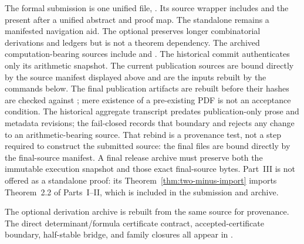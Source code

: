 \documentclass[11pt,reqno]{amsart}
\theoremstyle{plain}
\theoremstyle{definition}
\begin{document}
The formal submission is one unified file, .  Its source
wrapper  includes  and the present
 after a unified abstract and proof map.  The
standalone  remains a manifested navigation aid.  The
optional  preserves
longer combinatorial derivations and ledgers but is not a theorem dependency.
The archived computation-bearing sources include  and
.  The historical commit authenticates only its
arithmetic snapshot.  The current publication sources are bound directly by
the source manifest displayed above and are the inputs
rebuilt by the commands below.  The final publication artifacts are rebuilt before
their hashes are checked against ; mere
existence of a pre-existing PDF is not an acceptance condition.  The
historical aggregate transcript predates
publication-only prose and metadata revisions; the fail-closed
 records that boundary and rejects
any change to an arithmetic-bearing source.  That rebind is a provenance test,
not a step required to construct the submitted source: the final files are
bound directly by the final-source manifest.  A final release archive must
preserve both the immutable execution snapshot and those exact final-source
bytes.
Part~III is not offered as a
standalone proof: its Theorem~\ref{thm:two-minus-import} imports Theorem~2.2
of Parts~I--II, which is included in the submission and archive.

The optional derivation archive  is rebuilt from the same
source for provenance.  The direct determinant/formula certificate contract,
accepted-certificate boundary, half-stable bridge, and family closures all
appear in .
\end{document}

